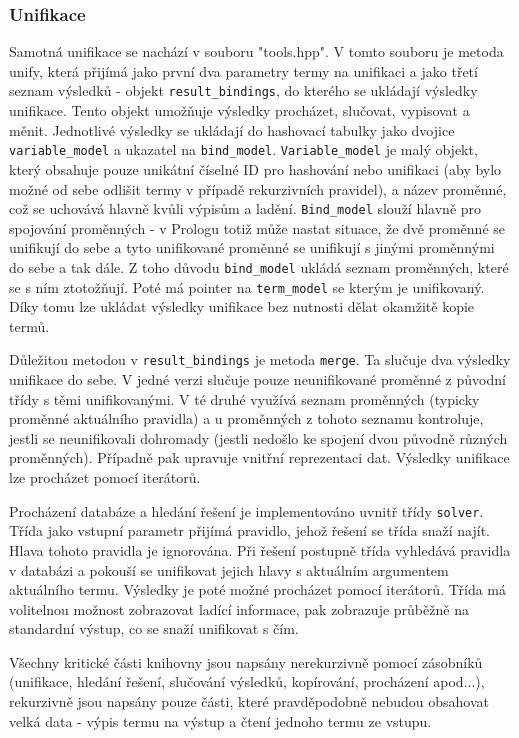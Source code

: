 \documentclass[12pt,a4paper,titlepage]{scrartcl}
\begin{document}
	\subsubsection{Unifikace}
	Samotná unifikace se nachází v souboru "tools.hpp". V tomto souboru je metoda unify, která přijímá jako první dva parametry termy na unifikaci a jako třetí seznam výsledků - objekt \texttt{result\_bindings}, do kterého se ukládají výsledky unifikace. Tento objekt umožňuje výsledky procházet, slučovat, vypisovat a měnit. Jednotlivé výsledky se ukládají do hashovací tabulky jako dvojice \texttt{variable\_model} a ukazatel na \texttt{bind\_model}. \texttt{Variable\_model} je malý objekt, který obsahuje pouze unikátní číselné ID pro hashování nebo unifikaci (aby bylo možné od sebe odlišit termy v případě rekurzivních pravidel), a název proměnné, což se uchovává hlavně kvůli výpisům a ladění. \texttt{Bind\_model} slouží hlavně pro spojování proměnných - v Prologu totiž může nastat situace, že dvě proměnné se unifikují do sebe a tyto unifikované proměnné se unifikují s jinými proměnnými do sebe a tak dále. Z toho důvodu \texttt{bind\_model} ukládá seznam proměnných, které se s ním ztotožňují. Poté má pointer na \texttt{term\_model} se kterým je unifikovaný. Díky tomu lze ukládat výsledky unifikace bez nutnosti dělat okamžitě kopie termů.
	\par
	Důležitou metodou v \texttt{result\_bindings} je metoda \texttt{merge}. Ta slučuje dva výsledky unifikace do sebe. V jedné verzi slučuje pouze neunifikované proměnné z původní třídy s těmi unifikovanými. V té druhé využívá seznam proměnných (typicky proměnné aktuálního pravidla) a u proměnných z tohoto seznamu kontroluje, jestli se neunifikovali dohromady (jestli nedošlo ke spojení dvou původně různých proměnných). Případně pak upravuje vnitřní reprezentaci dat. Výsledky unifikace lze procházet pomocí iterátorů.
	\par
	Procházení databáze a hledání řešení je implementováno uvnitř třídy \texttt{solver}. Třída jako vstupní parametr přijímá pravidlo, jehož řešení se třída snaží najít. Hlava tohoto pravidla je ignorována. Při řešení postupně třída vyhledává pravidla v databázi a pokouší se unifikovat jejich hlavy s aktuálním argumentem aktuálního termu. Výsledky je poté možné procházet pomocí iterátorů. Třída má volitelnou možnost zobrazovat ladící informace, pak zobrazuje průběžně na standardní výstup, co se snaží unifikovat s čím.
	\par
	Všechny kritické části knihovny jsou napsány nerekurzivně pomocí zásobníků (unifikace, hledání řešení, slučování výsledků, kopírování, procházení apod...), rekurzivně jsou napsány pouze části, které pravděpodobně nebudou obsahovat velká data - výpis termu na výstup a čtení jednoho termu ze vstupu.
\end{document}

